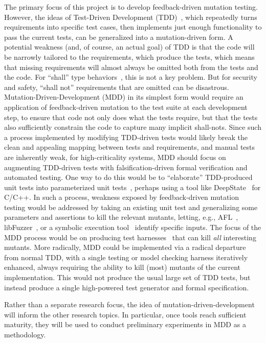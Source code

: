 The primary focus of this project is to develop feedback-driven mutation
testing.  However, the ideas of Test-Driven Development
(TDD)~\cite{TDD,TDDFuture}, which repeatedly turns requirements into specific
test cases, then implements just enough functionality to pass the current tests,
can be generalized into a mutation-driven form.  A potential weakness (and, of
course, an actual goal) of TDD is that the code will be narrowly tailored to the
requirements, which produce the tests, which means that missing requirements
will almost always be omitted both from the tests and the code.  For ``shall''
type behaviors~\cite{INCOSE}, this is not a key problem.  But for security and
safety, ``shall not'' requirements that are omitted can be disastrous.
Mutation-Driven-Development (MDD) in its simplest form would require an
application of feedback-driven mutation to the test suite at each development
step, to ensure that code not only does what the tests require, but that the
tests also sufficiently constrain the code to capture many implicit shall-nots.
Since such a process implemented by modifying TDD-driven tests would likely
break the clean and appealing mapping between tests and requirements, and manual
tests are inherently weak, for high-criticality systems, MDD should focus on
augmenting TDD-driven tests with falsification-driven formal verification and
automated testing.  One way to do this would be to ``elaborate'' TDD-produced
unit tests into parameterized unit tests~\cite{UnitMeister,ParamUnit}, perhaps
using a tool like DeepState~\cite{DeepState} for C/C++.  In such a process,
weakness exposed by feedback-driven mutation testing would be addressed by
taking an existing unit test and generalizing some parameters and assertions to
kill the relevant mutants, letting, e.g., AFL~\cite{aflfuzz},
libFuzzer~\cite{libfuzzer}, or a symbolic execution
tool~\cite{angr1,angr2,manticore} identify specific inputs.  The focus of the
MDD process would be on producing test harnesses~\cite{WODACommon,tstlsttt} that
can kill \emph{all} interesting mutants.  More radically, MDD could
be implemented via a radical departure from normal TDD, with a single testing or
model checking harness iteratively enhanced, always requiring the ability to kill (most) mutants of
the current implementation.  This would not produce the usual large set of TDD
tests, but instead produce a single high-powered test generator and formal
specification.

Rather than a separate research focus, the idea of
mutation-driven-development will inform the other
research topics.  In particular, once tools
reach sufficient maturity, they will be used to conduct preliminary
experiments in MDD as a methodology.  %



